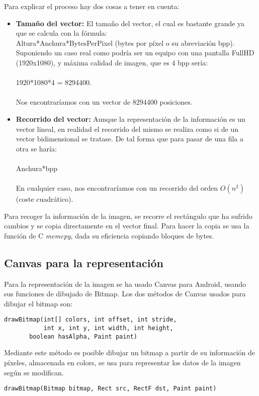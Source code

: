Para explicar el proceso hay dos cosas a tener en cuenta:
\begin{itemize}
\item \textbf{Tamaño del vector:} El tamaño del vector, el cual es bastante grande ya que se calcula con la fórmula:\\
Altura*Anchura*BytesPerPixel (bytes por píxel o su abreviación bpp).\\
Suponiendo un caso real como podría ser un equipo con una pantalla FullHD (1920x1080), y máxima calidad de imagen, que es 4 bpp sería:\\
\\
1920*1080*4 = 8294400.\\
\\
Nos encontraríamos con un vector de 8294400 posiciones.\newpage
\item \textbf{Recorrido del vector:} Aunque la representación de la información es un vector lineal, en realidad el recorrido del mismo se realiza como si de un vector bidimensional se tratase. De tal forma que para pasar de una fila a otra se haría:\\
\\
Anchura*bpp\\
\\
En cualquier caso, nos encontraríamos con un recorrido del orden $O(n^2)$ (coste cuadrático).
\end{itemize}

Para recoger la información de la imagen, se recorre el rectángulo que ha sufrido cambios y se copia directamente en el vector final. Para hacer la copia se usa la función de C \emph{memcpy}, dada su eficiencia copiando bloques de bytes.

\subsection{Canvas para la representación}

Para la representación de la imagen se ha usado Canvas para Android, usando sus funciones de dibujado de Bitmap. Los dos métodos de Canvas usados para dibujar el bitmap son:
\begin{lstlisting}
drawBitmap(int[] colors, int offset, int stride, 
           int x, int y, int width, int height, 
	   boolean hasAlpha, Paint paint)
\end{lstlisting}

Mediante este método es posible dibujar un bitmap a partir de su información de píxeles, almacenada en colors, se usa para representar los datos de la imagen según se modifican.
\begin{lstlisting}
drawBitmap(Bitmap bitmap, Rect src, RectF dst, Paint paint)
\end{lstlisting}

